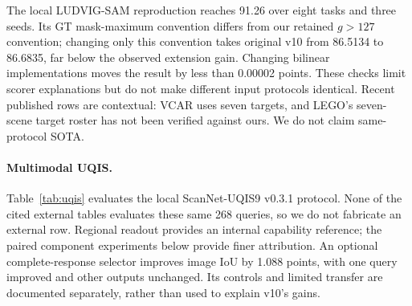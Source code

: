 The local LUDVIG-SAM reproduction reaches 91.26 over eight tasks and three
seeds. Its GT mask-maximum convention differs from our retained $g>127$
convention; changing only this convention takes original v10 from 86.5134 to
86.6835, far below the observed extension gain. Changing bilinear
implementations moves the result by less than 0.00002 points. These checks
limit scorer explanations but do not make different input protocols identical.
Recent published rows are contextual: VCAR uses seven targets, and LEGO's
seven-scene target roster has not been verified against ours. We do not claim
same-protocol SOTA.
\begin{table}[ht]
\centering\small
\caption{NVOS comparison context. P values retain LUDVIG Tables 1/D and
later papers' provenance~\cite{ludvig,vcar,lego,wildseg3d,trace3d}.
N14 policies are fixed across all eight tasks. N16 has the highest measured
native IoU but lower AP (98.47 versus 98.95); it is not a uniform improvement.
All intervening variants remain in the diagnostic supplement.}
\label{tab:nvos}
\end{table}

\paragraph{Multimodal UQIS.}
Table~\ref{tab:uqis} evaluates the local ScanNet-UQIS9 v0.3.1 protocol. None
of the cited external tables evaluates these same 268 queries, so we do not
fabricate an external row. Regional readout provides an internal capability
reference; the paired component experiments below provide finer attribution.
An optional complete-response selector improves image IoU by 1.088 points,
with one query improved and other outputs unchanged. Its controls and limited
transfer are documented separately, rather than used to explain v10's gains.
\begin{table}[ht]
\centering\small\resizebox{\linewidth}{!}{}
\caption{All four UQIS modalities: text (T), image (I), 2D point (P2) and
3D point (P3). Actual-set IoU and continuous-response AP are distinct.
Both rows use our system; the regional baseline is not an external method.}
\label{tab:uqis}
\end{table}

